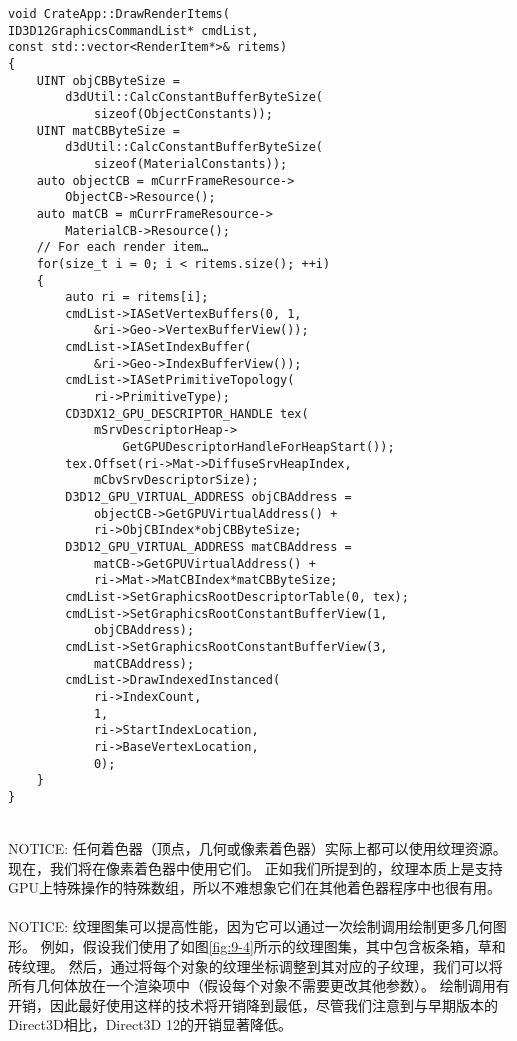 \begin{lstlisting}
void CrateApp::DrawRenderItems(
ID3D12GraphicsCommandList* cmdList,
const std::vector<RenderItem*>& ritems)
{
    UINT objCBByteSize =
        d3dUtil::CalcConstantBufferByteSize(
            sizeof(ObjectConstants));
    UINT matCBByteSize =
        d3dUtil::CalcConstantBufferByteSize(
            sizeof(MaterialConstants));
    auto objectCB = mCurrFrameResource->
        ObjectCB->Resource();
    auto matCB = mCurrFrameResource->
        MaterialCB->Resource();
    // For each render item…
    for(size_t i = 0; i < ritems.size(); ++i)
    {
        auto ri = ritems[i];
        cmdList->IASetVertexBuffers(0, 1, 
            &ri->Geo->VertexBufferView());
        cmdList->IASetIndexBuffer(
            &ri->Geo->IndexBufferView());
        cmdList->IASetPrimitiveTopology(
            ri->PrimitiveType);
        CD3DX12_GPU_DESCRIPTOR_HANDLE tex(
            mSrvDescriptorHeap->
                GetGPUDescriptorHandleForHeapStart());
        tex.Offset(ri->Mat->DiffuseSrvHeapIndex, 
            mCbvSrvDescriptorSize);
        D3D12_GPU_VIRTUAL_ADDRESS objCBAddress =
            objectCB->GetGPUVirtualAddress() +
            ri->ObjCBIndex*objCBByteSize;
        D3D12_GPU_VIRTUAL_ADDRESS matCBAddress =
            matCB->GetGPUVirtualAddress() +
            ri->Mat->MatCBIndex*matCBByteSize;
        cmdList->SetGraphicsRootDescriptorTable(0, tex);
        cmdList->SetGraphicsRootConstantBufferView(1,
            objCBAddress);
        cmdList->SetGraphicsRootConstantBufferView(3,
            matCBAddress);
        cmdList->DrawIndexedInstanced(
            ri->IndexCount,
            1, 
            ri->StartIndexLocation,
            ri->BaseVertexLocation, 
            0);
    }
}
\end{lstlisting}

\begin{flushleft}
~\\
NOTICE: 任何着色器（顶点，几何或像素着色器）实际上都可以使用纹理资源。 现在，我们将在像素着色器中使用它们。 正如我们所提到的，纹理本质上是支持GPU上特殊操作的特殊数组，所以不难想象它们在其他着色器程序中也很有用。\\
~\\

NOTICE: 纹理图集可以提高性能，因为它可以通过一次绘制调用绘制更多几何图形。 例如，假设我们使用了如图\ref{fig:9-4}所示的纹理图集，其中包含板条箱，草和砖纹理。 然后，通过将每个对象的纹理坐标调整到其对应的子纹理，我们可以将所有几何体放在一个渲染项中（假设每个对象不需要更改其他参数）。 绘制调用有开销，因此最好使用这样的技术将开销降到最低，尽管我们注意到与早期版本的Direct3D相比，Direct3D 12的开销显著降低。\\
~\\
\end{flushleft}


